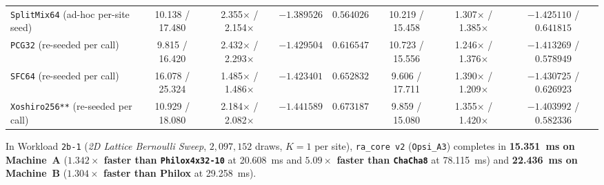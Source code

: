 \documentclass[conference]{IEEEtran}
\begin{document}
\begin{table}[t]
{\begin{tabular}{lccccccc}
\texttt{SplitMix64} (ad-hoc per-site seed) & 10.138 / 17.480 & 2.355$\times$ / 2.154$\times$ & $-1.389526$ & $0.564026$ & 10.219 / 15.458 & 1.307$\times$ / 1.385$\times$ & $-1.425110$ / $0.641815$ \\
\texttt{PCG32} (re-seeded per call) & 9.815 / 16.420 & 2.432$\times$ / 2.293$\times$ & $-1.429504$ & $0.616547$ & 10.723 / 15.556 & 1.246$\times$ / 1.376$\times$ & $-1.413269$ / $0.578949$ \\
\texttt{SFC64} (re-seeded per call) & 16.078 / 25.324 & 1.485$\times$ / 1.486$\times$ & $-1.423401$ & $0.652832$ & 9.606 / 17.711 & 1.390$\times$ / 1.209$\times$ & $-1.430725$ / $0.626923$ \\
\texttt{Xoshiro256**} (re-seeded per call) & 10.929 / 18.080 & 2.184$\times$ / 2.082$\times$ & $-1.441589$ & $0.673187$ & 9.859 / 15.080 & 1.355$\times$ / 1.420$\times$ & $-1.403992$ / $0.582336$ \\
\bottomrule
\end{tabular}%
}
\end{table}

In Workload \texttt{2b-1} (\emph{2D Lattice Bernoulli Sweep}, $2{,}097{,}152$ draws, $K=1$ per site), \texttt{ra\_core v2} (\texttt{Opsi\_A3}) completes in \textbf{15.351~ms on Machine~A} (\textbf{$1.342\times$ faster than \texttt{Philox4x32-10}} at 20.608~ms and \textbf{$5.09\times$ faster than \texttt{ChaCha8}} at 78.115~ms) and \textbf{22.436~ms on Machine~B} (\textbf{$1.304\times$ faster than Philox} at 29.258~ms).
\end{document}

